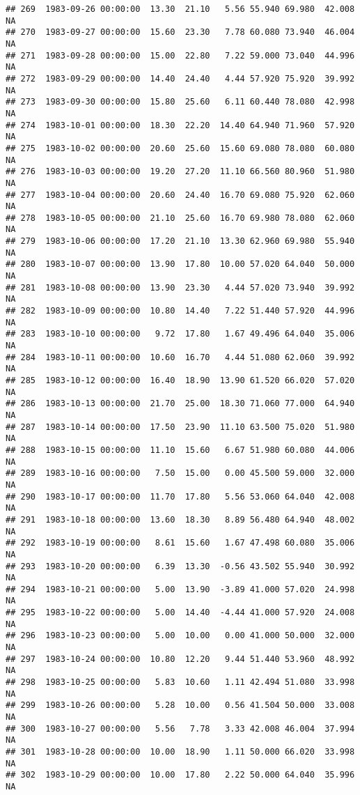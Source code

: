 \documentclass{article}\usepackage{graphicx, color}
\makeatletter
\newenvironment{kframe}{%
 \def\at@end@of@kframe{}%
 \ifinner\ifhmode%
  \def\at@end@of@kframe{\end{minipage}}%
  \begin{minipage}{\columnwidth}%
 \fi\fi%
 \def\FrameCommand##1{\hskip\@totalleftmargin \hskip-\fboxsep
 \colorbox{shadecolor}{##1}\hskip-\fboxsep
     \hskip-\linewidth \hskip-\@totalleftmargin \hskip\columnwidth}%
 \MakeFramed {\advance\hsize-\width
   \@totalleftmargin\z@ \linewidth\hsize
   \@setminipage}}%
 {\par\unskip\endMakeFramed%
 \at@end@of@kframe}
\newenvironment{knitrout}{}{} %
\makeatother
\begin{document}
\begin{knitrout}
\begin{kframe}
\begin{verbatim}
## 269  1983-09-26 00:00:00  13.30  21.10   5.56 55.940 69.980  42.008     NA
## 270  1983-09-27 00:00:00  15.60  23.30   7.78 60.080 73.940  46.004     NA
## 271  1983-09-28 00:00:00  15.00  22.80   7.22 59.000 73.040  44.996     NA
## 272  1983-09-29 00:00:00  14.40  24.40   4.44 57.920 75.920  39.992     NA
## 273  1983-09-30 00:00:00  15.80  25.60   6.11 60.440 78.080  42.998     NA
## 274  1983-10-01 00:00:00  18.30  22.20  14.40 64.940 71.960  57.920     NA
## 275  1983-10-02 00:00:00  20.60  25.60  15.60 69.080 78.080  60.080     NA
## 276  1983-10-03 00:00:00  19.20  27.20  11.10 66.560 80.960  51.980     NA
## 277  1983-10-04 00:00:00  20.60  24.40  16.70 69.080 75.920  62.060     NA
## 278  1983-10-05 00:00:00  21.10  25.60  16.70 69.980 78.080  62.060     NA
## 279  1983-10-06 00:00:00  17.20  21.10  13.30 62.960 69.980  55.940     NA
## 280  1983-10-07 00:00:00  13.90  17.80  10.00 57.020 64.040  50.000     NA
## 281  1983-10-08 00:00:00  13.90  23.30   4.44 57.020 73.940  39.992     NA
## 282  1983-10-09 00:00:00  10.80  14.40   7.22 51.440 57.920  44.996     NA
## 283  1983-10-10 00:00:00   9.72  17.80   1.67 49.496 64.040  35.006     NA
## 284  1983-10-11 00:00:00  10.60  16.70   4.44 51.080 62.060  39.992     NA
## 285  1983-10-12 00:00:00  16.40  18.90  13.90 61.520 66.020  57.020     NA
## 286  1983-10-13 00:00:00  21.70  25.00  18.30 71.060 77.000  64.940     NA
## 287  1983-10-14 00:00:00  17.50  23.90  11.10 63.500 75.020  51.980     NA
## 288  1983-10-15 00:00:00  11.10  15.60   6.67 51.980 60.080  44.006     NA
## 289  1983-10-16 00:00:00   7.50  15.00   0.00 45.500 59.000  32.000     NA
## 290  1983-10-17 00:00:00  11.70  17.80   5.56 53.060 64.040  42.008     NA
## 291  1983-10-18 00:00:00  13.60  18.30   8.89 56.480 64.940  48.002     NA
## 292  1983-10-19 00:00:00   8.61  15.60   1.67 47.498 60.080  35.006     NA
## 293  1983-10-20 00:00:00   6.39  13.30  -0.56 43.502 55.940  30.992     NA
## 294  1983-10-21 00:00:00   5.00  13.90  -3.89 41.000 57.020  24.998     NA
## 295  1983-10-22 00:00:00   5.00  14.40  -4.44 41.000 57.920  24.008     NA
## 296  1983-10-23 00:00:00   5.00  10.00   0.00 41.000 50.000  32.000     NA
## 297  1983-10-24 00:00:00  10.80  12.20   9.44 51.440 53.960  48.992     NA
## 298  1983-10-25 00:00:00   5.83  10.60   1.11 42.494 51.080  33.998     NA
## 299  1983-10-26 00:00:00   5.28  10.00   0.56 41.504 50.000  33.008     NA
## 300  1983-10-27 00:00:00   5.56   7.78   3.33 42.008 46.004  37.994     NA
## 301  1983-10-28 00:00:00  10.00  18.90   1.11 50.000 66.020  33.998     NA
## 302  1983-10-29 00:00:00  10.00  17.80   2.22 50.000 64.040  35.996     NA

\end{verbatim}
\end{kframe}
\end{knitrout}
\end{document}
